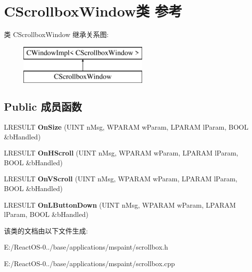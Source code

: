 \hypertarget{class_c_scrollbox_window}{}\section{C\+Scrollbox\+Window类 参考}
\label{class_c_scrollbox_window}
类 C\+Scrollbox\+Window 继承关系图\+:\begin{figure}[H]
\begin{center}
\leavevmode
\includegraphics[height=2.000000cm]{class_c_scrollbox_window}
\end{center}
\end{figure}
\subsection*{Public 成员函数}
\begin{DoxyCompactItemize}
\item 
\mbox{\label{class_c_scrollbox_window_a962b984114144eab95019ecd7df73153}} 
L\+R\+E\+S\+U\+LT {\bfseries On\+Size} (U\+I\+NT n\+Msg, W\+P\+A\+R\+AM w\+Param, L\+P\+A\+R\+AM l\+Param, B\+O\+OL \&b\+Handled)
\item 
\mbox{\label{class_c_scrollbox_window_a5fa2869c90504aa6100d155b1597fc19}} 
L\+R\+E\+S\+U\+LT {\bfseries On\+H\+Scroll} (U\+I\+NT n\+Msg, W\+P\+A\+R\+AM w\+Param, L\+P\+A\+R\+AM l\+Param, B\+O\+OL \&b\+Handled)
\item 
\mbox{\label{class_c_scrollbox_window_a2968ad793634984876573ef264f40b76}} 
L\+R\+E\+S\+U\+LT {\bfseries On\+V\+Scroll} (U\+I\+NT n\+Msg, W\+P\+A\+R\+AM w\+Param, L\+P\+A\+R\+AM l\+Param, B\+O\+OL \&b\+Handled)
\item 
\mbox{\label{class_c_scrollbox_window_afbd2a48fa1713f252b1ced69ffe5927d}} 
L\+R\+E\+S\+U\+LT {\bfseries On\+L\+Button\+Down} (U\+I\+NT n\+Msg, W\+P\+A\+R\+AM w\+Param, L\+P\+A\+R\+AM l\+Param, B\+O\+OL \&b\+Handled)
\end{DoxyCompactItemize}


该类的文档由以下文件生成\+:\begin{DoxyCompactItemize}
\item 
E\+:/\+React\+O\+S-\/0../base/applications/mspaint/scrollbox.\+h\item 
E\+:/\+React\+O\+S-\/0../base/applications/mspaint/scrollbox.\+cpp\end{DoxyCompactItemize}
